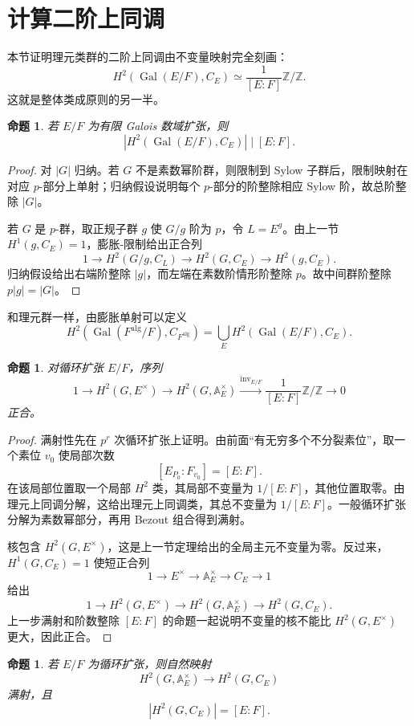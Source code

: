 \documentclass[11pt,a4paper,openany]{ctexbook}
\numberwithin{equation}{chapter}
\newcommand{\Z}{\mathbb{Z}}
\newcommand{\A}{\mathbb{A}}
\newcommand{\Gal}{\operatorname{Gal}}
\theoremstyle{plain}
\newtheorem{proposition}[theorem]{命题}
\theoremstyle{definition}
\theoremstyle{remark}
\begin{document}
\section{计算二阶上同调}

本节证明理元类群的二阶上同调由不变量映射完全刻画：
\[
H^2(\Gal(E/F),C_E)\simeq \frac1{[E:F]}\Z/\Z.
\]
这就是整体类成原则的另一半。

\begin{proposition}
若 $E/F$ 为有限 Galois 数域扩张，则
\[
|H^2(\Gal(E/F),C_E)|\mid [E:F].
\]
\end{proposition}

\begin{proof}
对 $|G|$ 归纳。若 $G$ 不是素数幂阶群，则限制到 Sylow 子群后，限制映射在对应 $p$-部分上单射；归纳假设说明每个 $p$-部分的阶整除相应 Sylow 阶，故总阶整除 $|G|$。

若 $G$ 是 $p$-群，取正规子群 $g$ 使 $G/g$ 阶为 $p$，令 $L=E^g$。由上一节 $H^1(g,C_E)=1$，膨胀-限制给出正合列
\[
1\to H^2(G/g,C_L)\to H^2(G,C_E)\to H^2(g,C_E).
\]
归纳假设给出右端阶整除 $|g|$，而左端在素数阶情形阶整除 $p$。故中间群阶整除 $p|g|=|G|$。
\end{proof}

和理元群一样，由膨胀单射可以定义
\[
H^2(\Gal(F^{\mathrm{alg}}/F),C_{F^{\mathrm{alg}}})
=\bigcup_E H^2(\Gal(E/F),C_E).
\]

\begin{proposition}
对循环扩张 $E/F$，序列
\[
1\to H^2(G,E^\times)\to H^2(G,\A_E^\times)
\stackrel{\operatorname{inv}_{E/F}}{\longrightarrow}
\frac1{[E:F]}\Z/\Z\to0
\]
正合。
\end{proposition}

\begin{proof}
满射性先在 $p^r$ 次循环扩张上证明。由前面“有无穷多个不分裂素位”，取一个素位 $v_0$ 使局部次数
\[
[E_{P_0}:F_{v_0}]=[E:F].
\]
在该局部位置取一个局部 $H^2$ 类，其局部不变量为 $1/[E:F]$，其他位置取零。由理元上同调分解，这给出理元上同调类，其总不变量为 $1/[E:F]$。一般循环扩张分解为素数幂部分，再用 Bezout 组合得到满射。

核包含 $H^2(G,E^\times)$，这是上一节定理给出的全局主元不变量为零。反过来，$H^1(G,C_E)=1$ 使短正合列
\[
1\to E^\times\to\A_E^\times\to C_E\to1
\]
给出
\[
1\to H^2(G,E^\times)\to H^2(G,\A_E^\times)\to H^2(G,C_E).
\]
上一步满射和阶数整除 $[E:F]$ 的命题一起说明不变量的核不能比 $H^2(G,E^\times)$ 更大，因此正合。
\end{proof}

\begin{proposition}
若 $E/F$ 为循环扩张，则自然映射
\[
H^2(G,\A_E^\times)\to H^2(G,C_E)
\]
满射，且
\[
|H^2(G,C_E)|=[E:F].
\]
\end{proposition}
\end{document}
